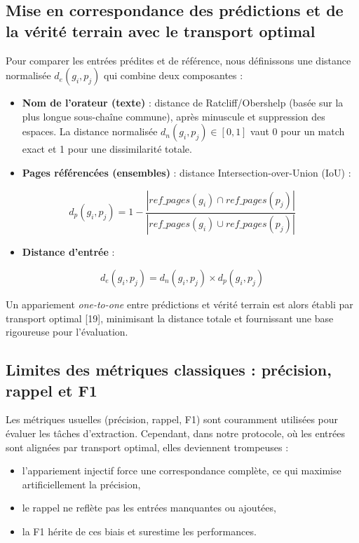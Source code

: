 \subsection{Mise en correspondance des prédictions et de la vérité terrain avec le transport optimal}

Pour comparer les entrées prédites et de référence, nous définissons une distance normalisée $d_e(g_i, p_j)$ qui combine deux composantes :

\begin{itemize}
\item \textbf{Nom de l’orateur (texte)} : distance de Ratcliff/Obershelp (basée sur la plus longue sous-chaîne commune), après minuscule et suppression des espaces. La distance normalisée $d_n(g_i, p_j) \in [0,1]$ vaut 0 pour un match exact et 1 pour une dissimilarité totale.

\item \textbf{Pages référencées (ensembles)} : distance Intersection-over-Union (IoU) :

\end{itemize}
$$
d_p(g_i, p_j) = 1 - \frac{|ref\_pages(g_i) \cap ref\_pages(p_j)|}{|ref\_pages(g_i) \cup ref\_pages(p_j)|}
$$

\begin{itemize}
\item \textbf{Distance d’entrée} :

\end{itemize}
$$
d_e(g_i, p_j) = d_n(g_i, p_j) \times d_p(g_i, p_j)
$$

Un appariement \emph{one-to-one} entre prédictions et vérité terrain est alors établi par transport optimal [19], minimisant la distance totale et fournissant une base rigoureuse pour l’évaluation.

\subsection{Limites des métriques classiques : précision, rappel et F1}

Les métriques usuelles (précision, rappel, F1) sont couramment utilisées pour évaluer les tâches d’extraction. Cependant, dans notre protocole, où les entrées sont alignées par transport optimal, elles deviennent trompeuses :

\begin{itemize}
\item l’appariement injectif force une correspondance complète, ce qui maximise artificiellement la précision,
\item le rappel ne reflète pas les entrées manquantes ou ajoutées,
\item la F1 hérite de ces biais et surestime les performances.

\end{itemize}
